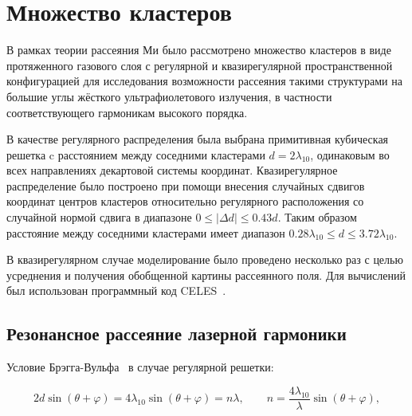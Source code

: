 \section{Множество кластеров}

В рамках теории рассеяния Ми было рассмотрено множество кластеров в виде протяженного газового слоя с регулярной и квазирегулярной пространственной конфигурацией для исследования возможности рассеяния такими структурами на большие углы жёсткого ультрафиолетового излучения, в частности соответствующего гармоникам высокого порядка.

В качестве регулярного распределения была выбрана примитивная кубическая решетка c расстоянием между соседними кластерами $d = 2\lambda_{10}$, одинаковым во всех направлениях декартовой системы координат. Квазирегулярное распределение было построено при помощи внесения случайных сдвигов координат центров кластеров относительно регулярного расположения со случайной нормой сдвига в диапазоне $0 \leq |\Delta d| \leq 0.43d$. Таким образом расстояние между соседними кластерами имеет диапазон $0.28\lambda_{10} \le d \le 3.72\lambda_{10}$.

В квазирегулярном случае моделирование было проведено несколько раз с целью усреднения и получения обобщенной картины рассеянного поля. Для вычислений был использован программный код CELES~\cite{celes}.

\subsection{Резонансное рассеяние лазерной гармоники}


Условие Брэгга-Вульфа~\cite{boren_huffman} в случае регулярной решетки:

    \begin{equation}
        2 d \sin(\theta+\varphi) = 4 \lambda_{10} \sin(\theta+\varphi) = n \lambda, \qquad n = \frac{4 \lambda_{10}}{\lambda} \sin(\theta+\varphi),
        \label{bragg_wolf_order}
    \end{equation}

